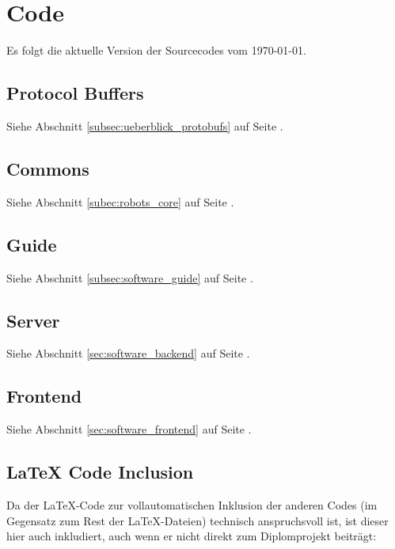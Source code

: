 \ExplSyntaxOff

\chapter{Code}
Es folgt die aktuelle Version der Sourcecodes vom \today.

\section{Protocol Buffers}
Siehe Abschnitt \ref{subsec:ueberblick_protobufs} auf Seite \pageref{subsec:ueberblick_protobufs}.
\newline
{}

\section{Commons}
Siehe Abschnitt \ref{subec:robots_core} auf Seite \pageref{subec:robots_core}.
\newline
{}

\section{Guide}
Siehe Abschnitt \ref{subsec:software_guide} auf Seite \pageref{subsec:software_guide}.
\newline
{}

\section{Server}
Siehe Abschnitt \ref{sec:software_backend} auf Seite \pageref{sec:software_backend}.
\newline
{}

\section{Frontend}
Siehe Abschnitt \ref{sec:software_frontend} auf Seite \pageref{sec:software_frontend}.
\newline
{}

\section{LaTeX Code Inclusion}
Da der LaTeX-Code zur vollautomatischen Inklusion der anderen Codes (im Gegensatz zum Rest der LaTeX-Dateien)
technisch anspruchsvoll ist,
ist dieser hier auch inkludiert,
auch wenn er nicht direkt zum Diplomprojekt beiträgt:

